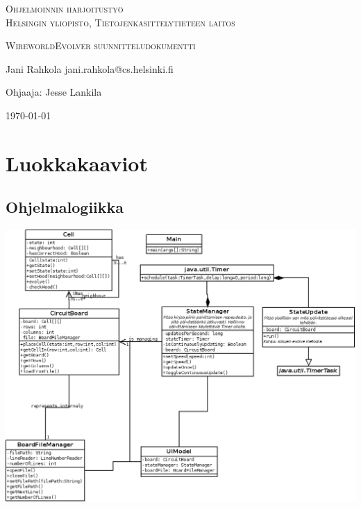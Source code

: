 \documentclass[a4paper,12pt]{article}
\begin{document}
\begin{titlepage}
\begin{center}
\textsc{\large Ohjelmoinnin harjoitustyö}\\[0.2cm] 
\textsc{\large Helsingin yliopisto, Tietojenkäsittelytieteen
laitos}\\[0.2cm]

\vspace{1cm}

\textsc{\LARGE WireworldEvolver suunnitteludokumentti}

\vspace{2cm}

Jani Rahkola
jani.rahkola@cs.helsinki.fi

Ohjaaja: Jesse Lankila


\vfill
{\large \today}

\end{center}
\end{titlepage}

\section{Luokkakaaviot}
\subsection{Ohjelmalogiikka}
\includegraphics[width=6in]{luokkakaavioOhjelmalogiikka.png}
\newpage
\end{document}
